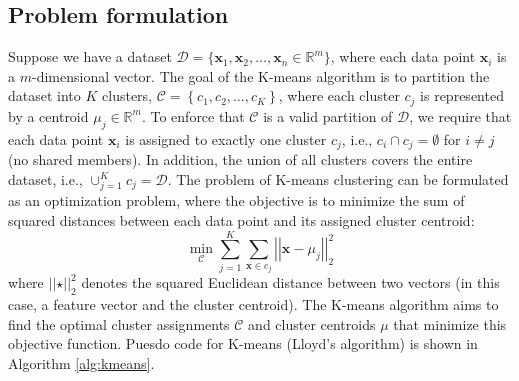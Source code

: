 \documentclass{article}[11pt]
\newcommand{\norm}[1]{\left|\left|#1\right|\right|}
\begin{document}
\subsection{Problem formulation}
Suppose we have a dataset $\mathcal{D} = \{\mathbf{x}_1, \mathbf{x}_2, \ldots, \mathbf{x}_n\in\mathbb{R}^{m}\}$, where each data point $\mathbf{x}_i$ is a $m$-dimensional vector.
The goal of the K-means algorithm is to partition the dataset into $K$ clusters, $\mathcal{C} = \left\{c_{1},c_{2},\dots, c_{K}\right\}$, 
where each cluster $c_{j}$ is represented by a centroid $\mu_j\in\mathbb{R}^{m}$. To enforce that $\mathcal{C}$ is a valid partition of $\mathcal{D}$, we require that each data point $\mathbf{x}_i$ is assigned to exactly one cluster $c_{j}$, i.e., $c_{i}\cap c_{j} = \emptyset$ for $i\neq j$ (no shared members).
In addition, the union of all clusters covers the entire dataset, i.e., $\cup_{j=1}^{K}c_{j} = \mathcal{D}$.
The problem of K-means clustering can be formulated as an optimization problem, 
where the objective is to minimize the sum of squared distances between each data point and its assigned cluster centroid:
\begin{equation}
\min_{\mathcal{C}} \sum_{j=1}^{K}\sum_{\mathbf{x}\in c_{j}}\norm{\mathbf{x} - \mu_{j}}_{2}^{2}
\end{equation}
where $\norm{\star}_{2}^{2}$ denotes the squared Euclidean distance between two vectors (in this case, a feature vector and the cluster centroid). 
The K-means algorithm aims to find the optimal cluster assignments $\mathcal{C}$ and cluster centroids $\mu$ that minimize this objective function.
Puesdo code for K-means (Lloyd's algorithm) is shown in Algorithm \ref{alg:kmeans}.
\end{document}
